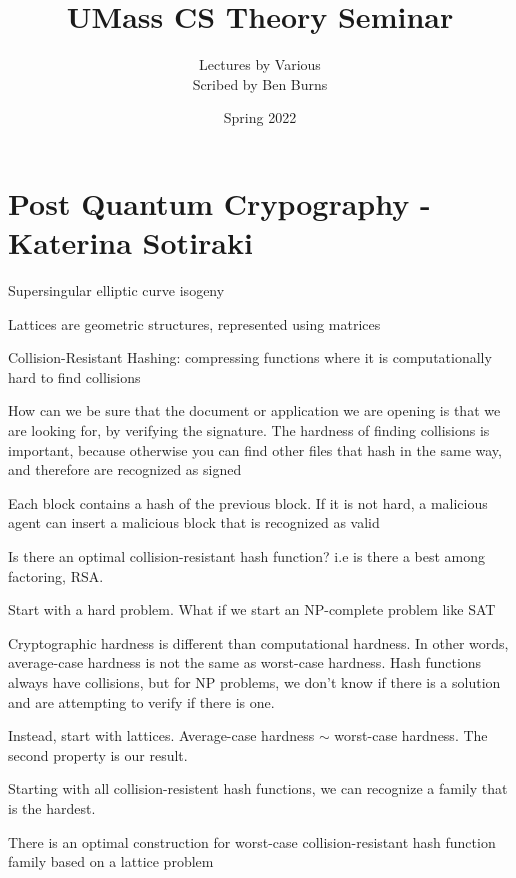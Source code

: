 \documentclass[twoside, 10pt]{article}
\title{UMass CS Theory Seminar}
\author{Lectures by Various \\ Scribed by Ben Burns}
\affil{UMass Amherst}
\date{Spring 2022}
\begin{document}
\maketitle\thispagestyle{firstpage}

\tableofcontents

\section{Post Quantum Crypography - Katerina Sotiraki}

Supersingular elliptic curve isogeny

Lattices are geometric structures, represented using matrices

Collision-Resistant Hashing: compressing functions where it is computationally hard to find collisions
\begin{exm*}
   How can we be sure that the document or application we are opening is that we are looking for, by verifying the signature. The hardness of finding collisions is important, because otherwise you can find other files that hash in the same way, and therefore are recognized as signed 
\end{exm*}

\begin{exm*}[Blockchains]
   Each block contains a hash of the previous block. If it is not hard, a malicious agent can insert a malicious block that is recognized as valid
\end{exm*}

Is there an optimal collision-resistant hash function? i.e is there a best among factoring, RSA. 

Start with a hard problem. What if we start an NP-complete problem like SAT

Cryptographic hardness is different than computational hardness. In other words, average-case hardness is not the same as worst-case hardness. Hash functions always have collisions, but for NP problems, we don't know if there is a solution and are attempting to verify if there is one.

Instead, start with lattices. Average-case hardness $\sim$ worst-case hardness. The second property is our result.

Starting with all collision-resistent hash functions, we can recognize a family that is the hardest. 

\begin{thm}
   There is an optimal construction for worst-case collision-resistant hash function family based on a lattice problem
\end{thm}
\end{document}
